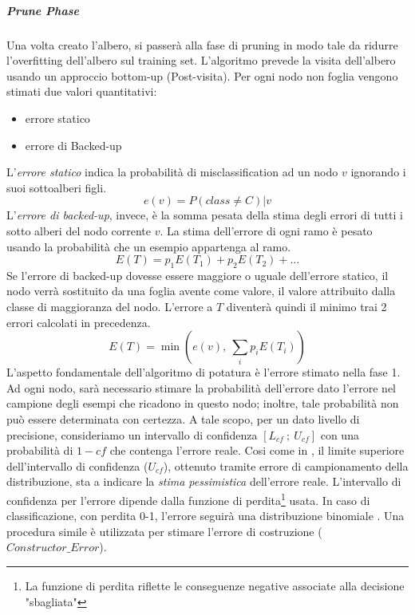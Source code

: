 \subparagraph{Prune Phase}
	Una volta creato l'albero, si passerà alla fase di pruning in modo tale da ridurre l'overfitting dell'albero sul training set. L'algoritmo prevede la visita dell'albero usando un approccio bottom-up (Post-visita). Per ogni nodo non foglia vengono stimati due valori quantitativi: 
\begin{itemize}
	\item errore statico
	\item errore di Backed-up
\end{itemize}
L'\emph{errore statico} indica la probabilità di misclassification ad un nodo $v$ ignorando i suoi sottoalberi figli.
$$e(v) = P (class \neq C)|v$$
L'\emph{errore di backed-up}, invece, è la somma pesata della stima degli errori di tutti i sotto alberi del nodo corrente $v$. La stima dell'errore di ogni ramo è pesato usando la probabilità che un esempio appartenga al ramo.
$$E(T)=p_1E(T_1)+p_2E(T_2)+\dots$$ 
Se l'errore di backed-up dovesse essere maggiore o uguale dell'errore statico, il nodo verrà sostituito da una foglia avente come valore, il valore attribuito dalla classe di maggioranza del nodo.
L'errore a $T$ diventerà quindi il minimo trai 2 errori calcolati in precedenza.
$$ E(T) = \min \left( e \left( v \right), ~ \sum_i p_i E \left( T_i \right) \right) $$
L'aspetto fondamentale dell'algoritmo di potatura è l'errore stimato nella fase 1. Ad ogni nodo, sarà necessario stimare la probabilità dell'errore dato l'errore nel campione degli esempi che ricadono in questo nodo; inoltre, tale probabilità non può essere determinata con certezza. A tale scopo, per un dato livello di precisione, consideriamo un intervallo di confidenza $\left[L_{cf}~;~U_{cf}\right]$ con una probabilità di $1-cf$ che contenga l'errore reale. Cosi come in \cite{Quinlan:1993a}, il limite superiore dell'intervallo di confidenza ($U_{cf}$), ottenuto tramite errore di campionamento della distribuzione, sta a indicare la \emph{stima pessimistica} dell'errore reale. L'intervallo di confidenza per l'errore dipende dalla funzione di perdita\footnote{ La funzione di perdita riflette le conseguenze negative associate alla decisione "sbagliata"} usata. In caso di classificazione, con perdita 0-1, l'errore seguirà una distribuzione binomiale \cite{mitchellbook}.
Una procedura simile è utilizzata per stimare l'errore di costruzione ($Constructor\_Error$).


